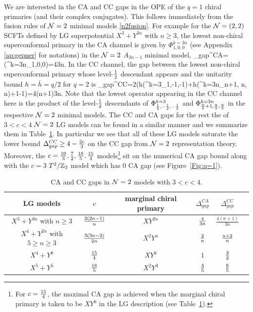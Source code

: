 \documentclass[12pt]{article}
\begin{document}
We are interested in the CA and CC gaps in the OPE of the $q=1$ chiral primaries (and their complex conjugates). 
This follows immediately from the fusion rules of ${\mathcal N}=2$ minimal models \eqref{n2fusion}.  For example for the ${\mathcal N}=(2,2)$  SCFTs defined by LG superpotential $X^3+ Y^{3n}$ with $n\geq 3$, the lowest non-chiral superconformal primary in the CA channel is given by $\Phi^{k=3n}_{1,0,0}$ (see Appendix \ref{ap:gepner} for notations) in the ${\mathcal N}=2$ $A_{3n-1}$ minimal model,
\ie
\Delta_{gap}^{CA}=\Delta(\Phi^{k={3n}}_{1,0,0})={4\over 3n}.
\fe
In the CC channel, the gap between the lowest non-chiral superconformal primary whose level-${1\over 2}$ descendant appears and the unitarity bound $h=\bar h =q/2$ for $q=2$ is
\ie
\Delta_{gap}^{CC}=2\left(h(\Phi^{k=3}_{{1},-{1},-{1}})+h(\Phi^{k=3n}_{{n}+1, {n}, {n}})+1-1\right)={4(n+1)\over 3n}.
\fe
Note that the lowest operator appearing in the CC channel here is the product of the level-${1\over 2}$ descendants of $\Phi^{k=3}_{{1\over 2},-{1\over 2},-{1\over 2}}$ and $\Phi^{k=3n}_{{n\over 2}+1, {n\over 2}, {n\over 2}}$ in the respective ${\mathcal N}=2$ minimal models. The CC and CA gaps for the rest the of $3<c<4$ ${\mathcal N}=2$ LG models can be found in a similar manner and we summarize them in Table~\ref{tab:tensorgap}. In particular we see that all of these LG models saturate the lower bound $\Delta_{gap}^{CC}\geq 4-{2c\over 3}$ on the CC gap  from ${\mathcal N}=2$ representation theory. Moreover, the $c={10\over 3},{7\over 2},{18\over 5},{15\over 4}$ models\footnote{For $c={15\over 4}$, the maximal CA gap is achieved when the marginal chiral primary is taken to be $XY^6$ in the LG description (see Table~\ref{tab:tensorgap}).} sit on the numerical CA gap bound along with the $c=3$  $T^2/\mathbb{Z}_3$ model which has $0$ CA gap (see Figure~\ref{Fig:q=1}).


\begin{table}[htb]
\begin{center}
\begin{tabular}{|c|c|c|c|c|c|}
\hline
LG models & $c$  & marginal chiral primary  & $\Delta_{gap}^{CA}$ & $\Delta_{gap}^{CC}$
\\
\hline 
$X^3 + Y^{3n}$ with $n\geq 3$ & ${2(2n-1)\over n}$ & $XY^{2n}$  & ${4\over 3n}$ & $\frac{4 (n+1)}{3 n}$
\\
\hline 
$X^4 + Y^{2n}$  with $5\geq n \geq 3$ & ${3(3n-2)\over 2n}$ & $X^2Y^{n}$  & ${2\over n}$ &  ${n+2\over n}$
\\
\hline 
$X^4 + Y^{8}$  & ${1 5\over 4}$  & $XY^6 $ & $ 1$ & ${3\over 2}$
\\
\hline 
$X^5 + Y^{5}$  & ${1 8\over 5}$  & $X^2Y^3 $ & ${4\over 5}$ & $8\over 5$
\\
\hline
\end{tabular}
\end{center}
\caption{CA and CC gaps in ${\mathcal N}=2$ models with $3<c<4$.}
\label{tab:tensorgap}
\end{table}
\end{document}
